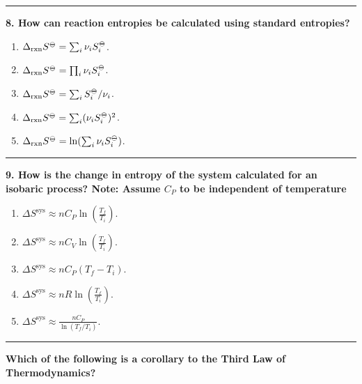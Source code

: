 \documentclass[
  9pt,
]{extbook}
\providecommand{\tightlist}{%
  \setlength{\itemsep}{0pt}\setlength{\parskip}{0pt}}
\theoremstyle{definition}
\theoremstyle{definition}
\theoremstyle{definition}
\theoremstyle{remark}
\begin{document}
\begin{center}\rule{0.5\linewidth}{0.5pt}\end{center}

\textbf{8. How can reaction entropies be calculated using standard entropies?}

\begin{enumerate}
\def\labelenumi{\alph{enumi}.}
\tightlist
\item
  \(\Delta_{\text{rxn}} S^{-\kern-6pt{\ominus}\kern-6pt-}= \sum_i \nu_i S^{-\kern-6pt{\ominus}\kern-6pt-}_i\).
\item
  \(\Delta_{\text{rxn}} S^{-\kern-6pt{\ominus}\kern-6pt-}= \prod_i \nu_i S^{-\kern-6pt{\ominus}\kern-6pt-}_i\).
\item
  \(\Delta_{\text{rxn}} S^{-\kern-6pt{\ominus}\kern-6pt-}= \sum_i S^{-\kern-6pt{\ominus}\kern-6pt-}_i / \nu_i\).
\item
  \(\Delta_{\text{rxn}} S^{-\kern-6pt{\ominus}\kern-6pt-}= \sum_i (\nu_i S^{-\kern-6pt{\ominus}\kern-6pt-}_i)^2\).
\item
  \(\Delta_{\text{rxn}} S^{-\kern-6pt{\ominus}\kern-6pt-}= \ln(\sum_i \nu_i S^{-\kern-6pt{\ominus}\kern-6pt-}_i)\).
\end{enumerate}

\begin{center}\rule{0.5\linewidth}{0.5pt}\end{center}

\textbf{9. How is the change in entropy of the system calculated for an isobaric process? Note: Assume \(C_P\) to be independent of temperature}

\begin{enumerate}
\def\labelenumi{\alph{enumi}.}
\tightlist
\item
  \(\Delta S^{\text{sys}} \approx nC_P \ln \left(\frac{T_f}{T_i}\right)\).
\item
  \(\Delta S^{\text{sys}} \approx nC_V \ln \left(\frac{T_f}{T_i}\right)\).
\item
  \(\Delta S^{\text{sys}} \approx nC_P (T_f - T_i)\).
\item
  \(\Delta S^{\text{sys}} \approx nR \ln \left(\frac{T_f}{T_i}\right)\).
\item
  \(\Delta S^{\text{sys}} \approx \frac{nC_P}{\ln (T_f/T_i)}\).
\end{enumerate}

\begin{center}\rule{0.5\linewidth}{0.5pt}\end{center}

\textbf{Which of the following is a corollary to the Third Law of Thermodynamics?}
\end{document}
